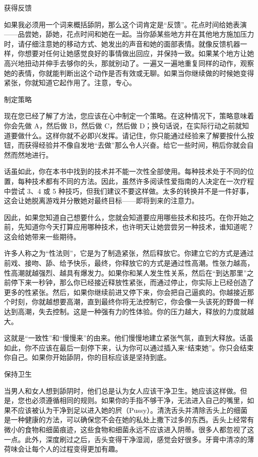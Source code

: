 \documentclass[12pt,UTF8]{ctexbook}
\begin{document}
获得反馈

如果我必须用一个词来概括舔阴，那么这个词肯定是“反馈”。花点时间给她表演——品尝她，舔她，花点时间和她在一起。当你舔某些地方并在其他地方施加压力时，请仔细注意她的移动方式、她发出的声音和她的面部表情。就像反馈机器一样，你想要对任何让她感觉良好的事情做出回应，并保持一致。如果某个地方让她高兴地扭动并伸手去够你的头，那就别动了。一遍又一遍地重复同样的动作，观察她的表情，你就能判断出这个动作是否有效或无聊。如果当你继续做的时候她变得紧张，你就知道它起作用了。注意，专心。

制定策略

现在您已经了解了方法，您应该在心中制定一个策略。在这种情况下，策略意味着你会先做 A，然后做 B，然后做 C，然后做 D；换句话说，在实际行动之前就知道要做什么。这样你就不必即兴发挥。请记住，你只能通过经验来了解要按什么按钮，而获得经验并不像自发地“去做”那么令人兴奋。给它一些时间，稍后你就会自然而然地进行。

话虽如此，你在本书中找到的技术并不能一次性全部使用。每种技术处于不同的位置，每种技术都有不同的方法。因此，虽然许多阅读性爱指南的人决定在一次疗程中尝试 3、4 或 5 种技巧，但我们建议不要这样做。太多的转换并不是一件好事，这会让她脱离游戏并分散她对最终目标——即将到来的注意力。

因此，如果您知道自己想要什么，您就会知道要应用哪些技术和技巧。在你开始之前，先知道你今天打算应用哪种技术，也许明天让她尝尝另一种技术，谁知道呢？ 这会给她带来一些期待。

许多人称之为“性法则”，它是为了制造紧张，然后释放它。你建立它的方式是通过前戏、接吻、舔、给予快乐，最终，你释放它的方式是通过性高潮。性张力越高，性高潮就越强烈、越具有爆发力。如果你和某人发生性关系，然后在“到达那里”之前停下来一秒钟，那么你已经接近释放性紧张，而通过停止，你实际上已经创造了更多的性紧张。然后，如果你继续前进又停下来，你会把自己逼疯的。你越接近那个时刻，你就越想要高潮，直到最终你将无法控制它，你会像一头该死的野兽一样达到高潮，失去控制。这是一种强有力的性体验。你的压力越大，释放的力度就越大。

这就是“一致性”和“慢慢来”的由来。他们慢慢地建立紧张气氛，直到大释放。话虽如此，你不应该在最后一刻停下来，认为你可以通过插入来“结束她”。你只会结束你自己。如果你开始舔阴，你的目标应该是坚持到底。

保持卫生

当男人和女人想到舔阴时，他们总是认为女人应该干净卫生。她应该这样做。但是，您也必须遵循相同的规则。如果你的手指不够干净，无法进入自己的嘴里，如果不应该被认为干净到足以进入她的屄（Pussy）。清洗舌头并清除舌头上的细菌是一种健康的方法，可以确保您不会在她的私处上撒下过多的东西。舌头上经常有微小的食物和细菌痕迹，这些食物和细菌永远不应该进入阴蒂。很多人都忽视了这一点。此外，深度刷过之后，舌头变得干净湿润，感觉会好很多。牙膏中清凉的薄荷味会让每个人的过程变得更加有趣。
\end{document}
